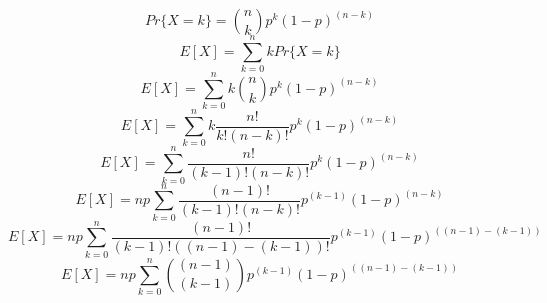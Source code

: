 \documentclass{article}
\begin{document}
	\begin{equation}
	Pr\{X = k\} = {n \choose k} p^k (1 - p)^{(n - k)}
	\end{equation}
	\begin{equation}
	E[X] = \sum_{k = 0}^{n} k Pr\{X = k\}
	\end{equation}
	\begin{equation}
	E[X] = \sum_{k = 0}^{n} k {n \choose k} p^k (1 - p)^{(n - k)}
	\end{equation}
	\begin{equation}
	E[X] = \sum_{k = 0}^{n} k \frac{n!}{k!(n - k)!} p^k (1 - p)^{(n - k)}
	\end{equation}
	\begin{equation}
	E[X] = \sum_{k = 0}^{n} \frac{n!}{(k - 1)!(n - k)!} p^k (1 - p)^{(n - k)}
	\end{equation}
	\begin{equation}
	E[X] = np \sum_{k = 0}^{n} \frac{(n - 1)!}{(k - 1)!(n - k)!} p^{(k - 1)} (1 - p)^{(n - k)}
	\end{equation}
	\begin{equation}
	E[X] = np \sum_{k = 0}^{n} \frac{(n - 1)!}{(k - 1)!((n - 1) - (k - 1))!} p^{(k - 1)} (1 - p)^{((n - 1) - (k - 1))}
	\end{equation}
	\begin{equation}
	E[X] = np \sum_{k = 0}^{n} {(n - 1) \choose (k - 1)} p^{(k - 1)} (1 - p)^{((n - 1) - (k - 1))}
	\end{equation}
\end{document}
